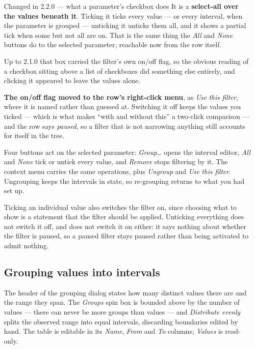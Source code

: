 \documentclass[11pt,a4paper,oneside]{report}
\newcommand{\appver}{2.2.0}
\begin{document}
\begin{aoenew}{Changed in \appver{} --- what a parameter's checkbox does}
It is a \textbf{select-all over the values beneath it}. Ticking it ticks every
value --- or every interval, when the parameter is grouped --- unticking it
unticks them all, and it shows a partial tick when some but not all are on.
That is the same thing the \emph{All} and \emph{None} buttons do to the selected
parameter, reachable now from the row itself.

Up to 2.1.0 that box carried the filter's own on/off flag, so the obvious
reading of a checkbox sitting above a list of checkboxes did something else
entirely, and clicking it appeared to leave the values alone.

\textbf{The on/off flag moved to the row's right-click menu}, as \emph{Use this
filter}, where it is named rather than guessed at. Switching it off keeps the
values you ticked --- which is what makes ``with and without this'' a two-click
comparison --- and the row says \emph{paused}, so a filter that is not narrowing
anything still accounts for itself in the tree.
\end{aoenew}

Four buttons act on the selected parameter: \emph{Group\ldots} opens the interval
editor, \emph{All} and \emph{None} tick or untick every value, and \emph{Remove}
stops filtering by it. The context menu carries the same operations, plus
\emph{Ungroup} and \emph{Use this filter}. Ungrouping keeps the intervals in
state, so re-grouping returns to what you had set up.

Ticking an individual value also switches the filter on, since choosing what to
show is a statement that the filter should be applied. Unticking everything does
not switch it off, and does not switch it on either: it says nothing about
whether the filter is paused, so a paused filter stays paused rather than being
activated to admit nothing.

\subsection{Grouping values into intervals}

The header of the grouping dialog states how many distinct values there are and
the range they span. The \emph{Groups} spin box is bounded above by the number of
values --- there can never be more groups than values --- and \emph{Distribute
evenly} splits the observed range into equal intervals, discarding boundaries
edited by hand. The table is editable in its \emph{Name}, \emph{From} and
\emph{To} columns; \emph{Values} is read-only.
\end{document}
